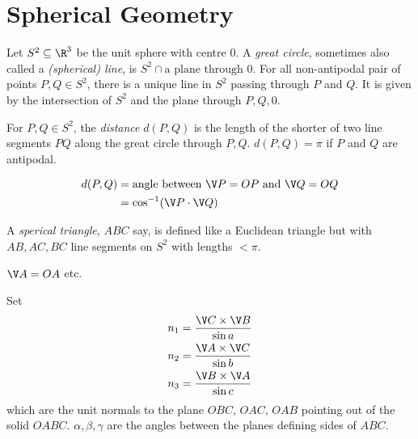 \documentclass[a4paper]{article}
\begin{document}
\section{Spherical Geometry}

\begin{notation}
  Let \(S^2 \subseteq \R^3\) be the unit sphere with centre \(0\). A \emph{great circle}, sometimes also called a \emph{(spherical) line}, is \(S^2 \cap \text{a plane through } 0\). For all non-antipodal pair of points \(P, Q \in S^2\), there is a unique line in \(S^2\) passing through \(P\) and \(Q\). It is given by the intersection of \(S^2\) and the plane through \(P, Q, 0\).
\end{notation}

\begin{definition}
  For \(P, Q \in S^2\), the \emph{distance} \(d(P, Q)\) is the length of the shorter of two line segments \(PQ\) along the great circle through \(P, Q\). \(d(P, Q) = \pi\) if \(P\) and \(Q\) are antipodal.
\end{definition}

\begin{note}
  \begin{align*}
    d(P, Q) &= \text{angle between } \V P = OP \text{ and } \V Q = OQ \\
            &= \cos^{-1} (\V P \cdot \V Q)
  \end{align*}
\end{note}

\begin{definition}
  A \emph{sperical triangle}, \(ABC\) say, is defined like a Euclidean triangle but with \(AB, AC, BC\) line segments on \(S^2\) with lengths \(< \pi\).
\end{definition}

\begin{notation}
  \(\V A = OA\) etc.
\end{notation}

Set
\begin{align*}
  n_1 &= \frac{\V C \times \V B}{\sin a} \\
  n_2 &= \frac{\V A \times \V C}{\sin b} \\
  n_3 &= \frac{\V B \times \V A}{\sin c}
\end{align*}
which are the unit normals to the plane \(OBC\), \(OAC\), \(OAB\) pointing out of the solid \(OABC\). \(\alpha, \beta, \gamma\) are the angles between the planes defining sides of \(ABC\).
\end{document}
